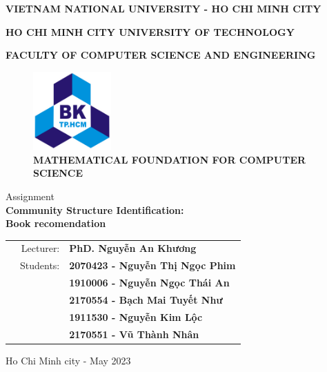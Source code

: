
\begin{titlepage}
\centerline{\bf \normalsize VIETNAM NATIONAL UNIVERSITY - HO CHI MINH CITY}
\centerline{\bf \normalsize HO CHI MINH CITY UNIVERSITY OF TECHNOLOGY}
\centerline{\bf \normalsize FACULTY OF COMPUTER SCIENCE AND ENGINEERING}
\vspace*{1cm}
\begin{figure}[h!]
	\begin{center}
		\includegraphics[width=3cm]{image/bku.png}
		\\
		\vspace{.5cm}
		\LARGE \textbf{MATHEMATICAL FOUNDATION FOR COMPUTER SCIENCE}
	\end{center}
\end{figure}

\begin{center}
    \Large Assignment
    \\
    \LARGE \textbf{Community Structure Identification:\\Book recomendation} \\
\end{center}

\vspace{3em}

\begin{table}[h]
\begin{tabular}{rrl}
\hspace{2.5 cm} & Lecturer: & \bf PhD. Nguyễn An Khương\\
& Students:  & \bf 2070423 - Nguyễn Thị Ngọc Phim\\
& & \bf 1910006 - Nguyễn Ngọc Thái An\\
& & \bf 2170554 - Bạch Mai Tuyết Như\\
& & \bf 1911530 - Nguyễn Kim Lộc\\
& & \bf 2170551 - Vũ Thành Nhân\\
\end{tabular}
\end{table}

\vspace{2.5em}

\vfill
\begin{center}
	{\normalsize Ho Chi Minh city - May 2023}
\end{center}
\end{titlepage}


\newpage

\thispagestyle{empty}